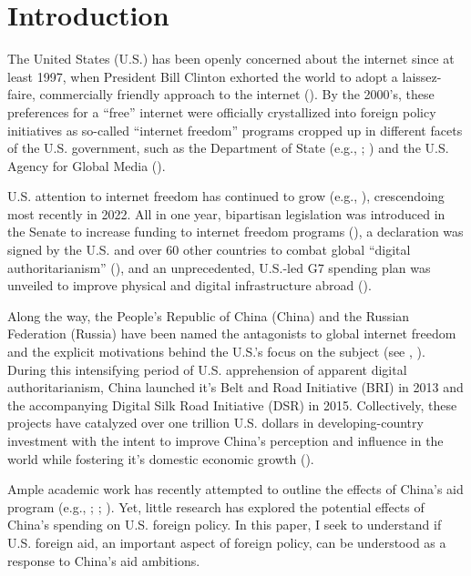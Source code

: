\section*{Introduction}
The United States (U.S.) has been openly concerned about the internet since at least 1997, when President Bill Clinton exhorted the world to adopt a laissez-faire, commercially friendly approach to the internet (\cite{government1997}). By the 2000's, these preferences for a ``free'' internet were officially crystallized into foreign policy initiatives as so-called ``internet freedom'' programs cropped up in different facets of the U.S. government, such as the Department of State (e.g., \cite{henry2014}; \cite{government2021a}) and the U.S. Agency for Global Media (\cite{government2022}).

U.S. attention to internet freedom has continued to grow (e.g., \cite{government2010}), crescendoing most recently in 2022. All in one year, bipartisan legislation was introduced in the Senate to increase funding to internet freedom programs (\cite{government2022a}), a declaration was signed by the U.S. and over 60 other countries to combat global ``digital authoritarianism'' (\cite{government2022b}), and an unprecedented, U.S.-led G7 spending plan was unveiled to improve physical and digital infrastructure abroad (\cite{government2022c}). 

Along the way, the People's Republic of China (China) and the Russian Federation (Russia) have been named the antagonists to global internet freedom and the explicit motivations behind the U.S.'s focus on the subject (see \cite{government2010}, \cite{government2022b}). During this intensifying period of U.S. apprehension of apparent digital authoritarianism, China launched it's Belt and Road Initiative (BRI) in 2013 and the accompanying Digital Silk Road Initiative (DSR) in 2015. Collectively, these projects have catalyzed over one trillion U.S. dollars in developing-country investment with the intent to improve China's perception and influence in the world while fostering it's domestic economic growth (\cite{dreher2022}).

Ample academic work has recently attempted to outline the effects of China's aid program (e.g., \cite{blair2021}; \cite{eichenauer2021}; \cite{dreher2018}). Yet, little research has explored the potential effects of China's spending on U.S. foreign policy. In this paper, I seek to understand if U.S. foreign aid, an important aspect of foreign policy, can be understood as a response to China's aid ambitions. 

